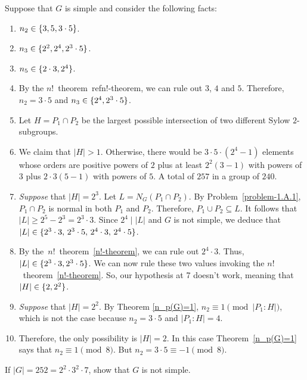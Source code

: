 \begin{solution} Suppose that $G$ is simple and consider the following facts:
\begin{enumerate}[\rm1.]
    \item $n_2\in\{3,5,3\cdot5\}$.
    \item $n_3\in\{2^2,2^4,2^3\cdot5\}$.
    \item $n_5\in\{2\cdot3,2^4\}$.
    \item By the $n!$~theorem~ref{n!-theorem}, we can rule out $3$, $4$ and $5$. Therefore, $n_2=3\cdot5$ and $n_3\in\{2^4,2^3\cdot5\}$.
    \item Let $H=P_1\cap P_2$ be the largest possible intersection of two different Sylow $2$-subgroups.
    \item We claim that $|H|>1$. Otherwise, there would be $3\cdot5\cdot(2^4-1)$ elements whose orders are positive powers of $2$ plus at least $2^2(3-1)$ with powers of $3$ plus $2\cdot3(5-1)$ with powers of $5$. A total of $257$ in a group of $240$.
    \item {\it Suppose\/} that $|H|=2^3$. Let $L=N_G(P_1\cap P_2)$. By Problem~\ref{problem-1.A.1}, $P_1\cap P_2$ is normal in both $P_1$  and $P_2$. Therefore, $P_1\cup P_2\subseteq L$. It follows that $|L|\ge 2^5-2^3=2^3\cdot3$. Since $2^4\mid|L|$ and $G$ is not simple, we deduce that $|L|\in\{2^3\cdot3,\,2^3\cdot5,\,2^4\cdot3,\,2^4\cdot5\}$.
    \item By the~$n!$~theorem~\ref{n!-theorem}, we can rule out $2^4\cdot3$. Thus, $|L|\in\{2^3\cdot3,2^3\cdot5\}$. We can now rule these two values invoking the $n!$~theorem~\ref{n!-theorem}. So, our hypothesis at 7 doesn't work, meaning that $|H|\in\{2,2^2\}$.
    \item {\it Suppose\/} that $|H|=2^2$. By Theorem \ref{n_p(G)=1}, $n_2\equiv1\pmod{|P_1:H|}$, which is not the case because $n_2=3\cdot5$ and $|P_1:H|=4$.
    \item Therefore, the only possibility is $|H|=2$. In this case Theorem~\ref{n_p(G)=1} says that $n_2\equiv1\pmod8$. But $n_2=3\cdot5\equiv-1\pmod8$.
\end{enumerate}
\end{solution}

\begin{probl}
    If\/ $|G|=252=2^2\cdot3^2\cdot7$, show that\/ $G$ is not simple.
\end{probl}

